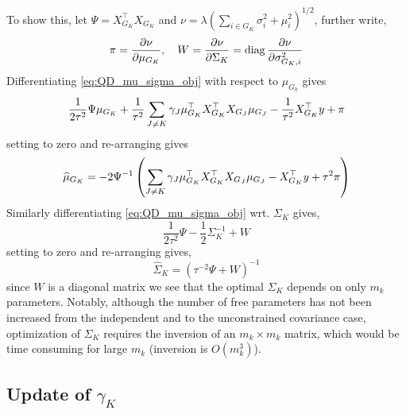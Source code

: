 \documentclass[12pt]{article}
\begin{document}
To show this, let $\Psi = X_{G_K}^\top X_{G_K}$ and $\nu = \lambda (\sum_{i \in G_K} \sigma^2_i + \mu^2_i)^{1/2}$, further write,
\begin{equation}
    \pi = \frac{\partial \nu}{\partial \mu_{G_K}}, \quad W = 
    \frac{\partial \nu}{\partial \Sigma_{K}} = \operatorname{diag} \frac{\partial \nu}{\partial \sigma_{G_K, i}^2}
\end{equation}
Differentiating \eqref{eq:QD_mu_sigma_obj} with respect to $\mu_{G_k}$ gives
\begin{equation}
    \frac{1}{2\tau^2} 
    \Psi \mu_{G_K}
+
    \frac{1}{\tau^2} 
    \sum_{J \neq K} 
	\gamma_J \mu_{G_K}^\top X_{G_K}^\top X_{G_J} \mu_{G_J} \\
-
    \frac{1}{\tau^2}
    X_{G_K}^\top y
+
    \pi
\end{equation}
setting to zero and re-arranging gives
\begin{equation}
    \widehat{\mu}_{G_K} = 
 - 2 \Psi^{-1} \left(  \sum_{J \neq K} 
	\gamma_J \mu_{G_K}^\top X_{G_K}^\top X_{G_J} \mu_{G_J} \\
-
    X_{G_K}^\top y
+
    \tau^2 \pi \right)
\end{equation}
Similarly differentiating \eqref{eq:QD_mu_sigma_obj} wrt. $\Sigma_K$ gives,
\begin{equation}
    \frac{1}{2\tau^2} \Psi
-	
    \frac{1}{2} \Sigma_K^{-1}
+
    W
\end{equation}
setting to zero and re-arranging gives,
\begin{equation}
    \widehat{\Sigma}_K = \left( \tau^{-2} \Psi + W \right)^{-1}
\end{equation}
since $W$ is a diagonal matrix we see that the optimal $\Sigma_K$ depends on only $m_k$ parameters. Notably, although the number of free parameters has not been increased from the independent and to the unconstrained covariance case, optimization of $\Sigma_K$ requires the inversion of an $m_k \times m_k$ matrix, which would be time consuming for large $m_k$ (inversion is $O(m_k^3)$).


\subsection{Update of $\gamma_K$}
\end{document}
